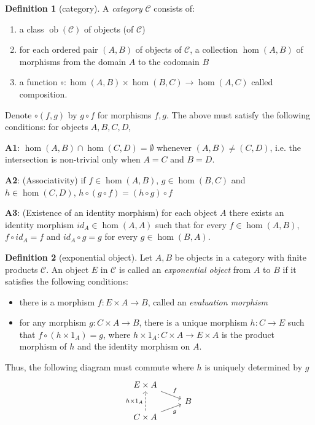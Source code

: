\documentclass[10pt]{article}
\theoremstyle{plain}
\theoremstyle{definition}
\newtheorem{definition}{Definition}
\theoremstyle{remark}
\begin{document}
\begin{definition}[category]
A \emph{category} $\mathcal{C}$ consists of:
\begin{enumerate}
\item a class $\operatorname{ob}(\mathcal{C})$ of objects (of $\mathcal{C}$)
\item for each ordered pair $(A,B)$ of objects of $\mathcal{C}$, a collection $\hom(A,B)$ of morphisms from the domain $A$ to the codomain $B$
\item a function $\circ:\hom(A,B)\times\hom(B,C)\to\hom(A,C)$ called composition.
\end{enumerate}
\end{definition}
Denote $\circ(f,g)$ by $g \circ f$ for morphisms $f,g$. The above must satisfy the following conditions: for objects $A,B,C,D$,

\textbf{A1}: $\hom(A,B) \cap \hom(C,D)=\emptyset$ whenever $(A,B)\neq (C,D)$, i.e. the intersection is non-trivial only when $A=C$ and $B=D$.

\textbf{A2}: (Associativity) if $f \in \hom(A,B)$, $g\in\hom(B,C)$ and $h\in\hom(C,D)$, $h\circ (g\circ f)=(h\circ g)\circ f$

\textbf{A3}: (Existence of an identity morphism) for each object $A$ there exists an identity morphism $ {}id_{A}\in\hom(A,A)$ such that for every $f\in\hom(A,B)$, $f\circ id_{A}=f$ and $ {}id_{A}\circ g=g$ for every $g \in \hom(B,A)$.

\begin{definition}[exponential object]
Let $A,B$ be objects in a category with finite products $\mathcal{C}$.  An object $E$ in $\mathcal{C}$ is called an \emph{exponential object} from $A$ to $B$ if it satisfies the following conditions:
\begin{itemize}
\item there is a morphism $f:E\times A\to B$, called an \emph{evaluation morphism}
\item for any morphism $g:C\times A\to B$, there is a unique morphism $h:C\to E$ such that $f\circ (h\times 1_A)=g$, where $h\times 1_A:C\times A\to E\times A$ is the product morphism of $h$ and the identity morphism on $A$.
\end{itemize}
Thus, the following diagram must commute where $h$ is uniquely determined by $g$
\[
\begin{tikzcd}[row sep=tiny,ampersand replacement=\&]
E \times A \arrow{dr}{f} \\
{} \& B \\
C \times A \arrow[dashed]{uu}{h \times 1_A} \arrow{ur}[swap]{g} \&
\end{tikzcd}
\]
\end{definition}
\end{document}
